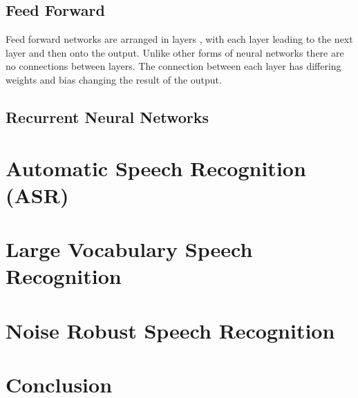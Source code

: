 \documentclass[11pt]{article}
\begin{document}
    \subsection{Feed Forward}
    Feed forward networks are arranged in layers \cite{NeuralArchitecture}, with each layer leading to the next layer and then onto the output. Unlike other forms of neural networks there are no connections between layers. The connection between each layer has differing weights and bias changing the result of the output.
    
    \subsection{Recurrent Neural Networks}
    
    
    
    
    
    
    \section{Automatic Speech Recognition (ASR)}
    


    \section{Large Vocabulary Speech Recognition}
    
    \section{Noise Robust Speech Recognition}
    
    \section{Conclusion}

        


\pagebreak

\printbibliography
\end{document}

